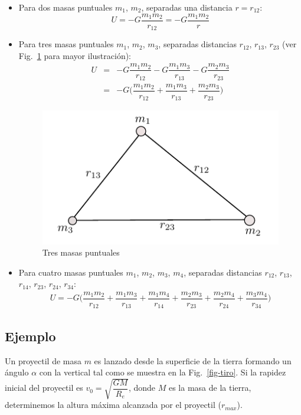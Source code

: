 \begin{itemize}
\item Para dos masas puntuales $m_1$, $m_2$, separadas una distancia $r=r_{12}$:
\begin{equation}
U=-G \dfrac{m_1m_2}{r_{12}}=-G \dfrac{m_1m_2}{r}
\end{equation}
\item Para tres masas puntuales $m_1$, $m_2$, $m_3$, separadas distancias $r_{12}$, $r_{13}$, $r_{23}$ (ver Fig.~\ref{figtresmasas} para mayor ilustración):
\begin{eqnarray}
\nonumber
U&=&-G \dfrac{m_1m_2}{r_{12}}-G \dfrac{m_1m_3}{r_{13}}-G \dfrac{m_2m_3}{r_{23}} \\
&=&-G\bigg(\dfrac{m_1m_2}{r_{12}}+ \dfrac{m_1m_3}{r_{13}}+\dfrac{m_2m_3}{r_{23}})
\end{eqnarray}
\begin{figure}
\begin{center}
\includegraphics[scale=0.9]{gravitacion/tresmasas}
\end{center}
\caption{Tres masas puntuales}
\label{figtresmasas}
\end{figure}
\item Para cuatro masas puntuales $m_1$, $m_2$, $m_3$, $m_4$, separadas distancias $r_{12}$, $r_{13}$, $r_{14}$, $r_{23}$, $r_{24}$, $r_{34}$:
\begin{eqnarray}
\nonumber
U=-G\bigg(\dfrac{m_1m_2}{r_{12}}+ \dfrac{m_1m_3}{r_{13}}+\dfrac{m_1m_4}{r_{14}}+\dfrac{m_2m_3}{r_{23}}+\dfrac{m_2m_4}{r_{24}}+\dfrac{m_3m_4}{r_{34}}\bigg)
\end{eqnarray}
\end{itemize}

\subsection*{Ejemplo}
Un proyectil de masa $m$ es lanzado desde la superficie de la tierra formando un ángulo $\alpha$ con la vertical tal como se muestra en la Fig.~\ref{fig-tiro}. Si la rapidez inicial del proyectil es $v_0=\sqrt{\dfrac{GM}{R_e}}$, donde $M$ es la masa de la tierra, determinemos la altura máxima alcanzada por el proyectil (\textbf{$r_{max}$}).\cite{klepner} \cite{youngfisica}

